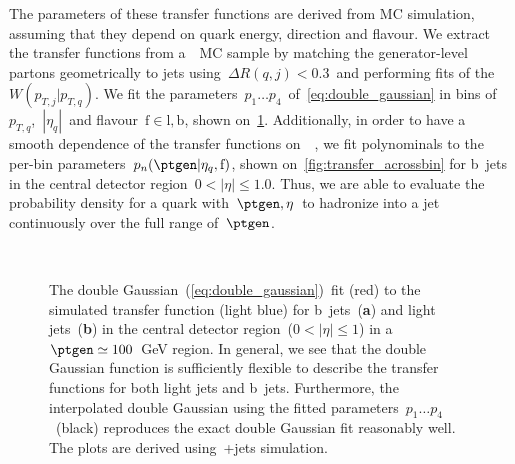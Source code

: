 The parameters of these transfer functions are derived from MC simulation, assuming that they depend on quark energy, direction and flavour. We extract the transfer functions from a~\ttbar~MC sample by matching the generator-level partons geometrically to jets using~$\Delta R(q,j) < 0.3$~and performing fits of the~$W(p_{T,j}|p_{T,q})$. We fit the parameters~$p_1 \dots p_4$~of~\cref{eq:double_gaussian} in bins of~$p_{T,q}$,~$|\eta_{q}|$~and flavour~$\mathrm{f}\in{\mathrm{l}, \mathrm{b}}$, shown on~\cref{fig:transfer_perbin}. Additionally, in order to have a smooth dependence of the transfer functions on~\ptgen~, we fit polynominals to the per-bin parameters~$p_n(\ptgen|\eta_{q},\mathrm{f})$, shown on~\cref{fig:transfer_acrossbin} for b~jets in the central detector region~$0 < |\eta| \le 1.0$. Thus, we are able to evaluate the probability density for a quark with~$\ptgen,\eta$~to hadronize into a jet continuously over the full range of~$\ptgen$.

\begin{figure}
\begin{centering}
 \\
\caption{The double Gaussian~(\cref{eq:double_gaussian})~fit (red) to the simulated transfer function (light blue) for b~jets~(\textbf{a}) and light jets~(\textbf{b}) in the central detector region~($0 < |\eta| \le 1$) in a~$\ptgen \simeq 100$~GeV region. In general, we see that the double Gaussian function is sufficiently flexible to describe the transfer functions for both light jets and b~jets. Furthermore, the interpolated double Gaussian using the fitted parameters~$p_1 \dots p_4$~(black) reproduces the exact double Gaussian fit reasonably well. The plots are derived using~\ttbar+jets simulation.}
\label{fig:transfer_perbin}
\end{centering}
\end{figure}

